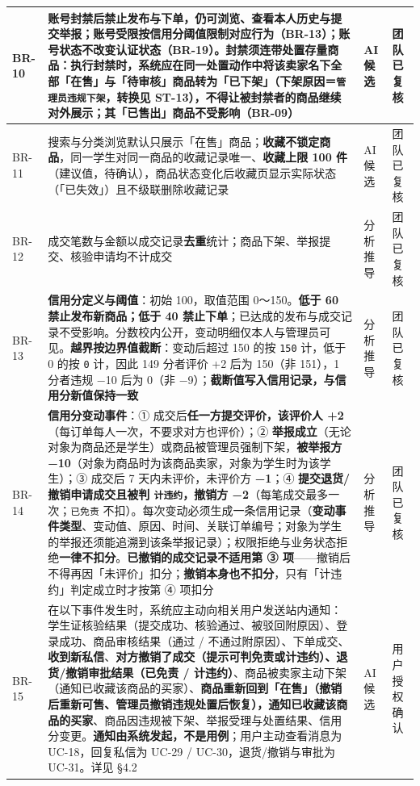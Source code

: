 \documentclass[12pt,a4paper]{ctexart}
\begin{document}
{\begin{longtable}{|p{1.32cm}|p{12.03cm}|p{1.32cm}|p{1.32cm}|}
\hline
BR-10 & 账号封禁后禁止发布与下单，仍可浏览、查看本人历史与提交举报；账号受限按信用分阈值限制对应行为（BR-13）；\textbf{账号状态不改变认证状态}（BR-19）。\textbf{封禁须连带处置存量商品}：执行封禁时，系统应在同一处置动作中将该卖家名下全部「在售」与「待审核」商品转为「已下架」（下架原因＝\texttt{管理员违规下架}，转换见 ST-13），\textbf{不得让被封禁者的商品继续对外展示}；其「已售出」商品不受影响（BR-09） & AI 候选 & 团队已复核 \\
\hline
BR-11 & 搜索与分类浏览默认只展示「在售」商品；\textbf{收藏不锁定商品}，同一学生对同一商品的收藏记录唯一、\textbf{收藏上限 100 件}（建议值，待确认），商品状态变化后收藏页显示实际状态（「已失效」）且不级联删除收藏记录 & AI 候选 & 团队已复核 \\
\hline
BR-12 & 成交笔数与金额以成交记录\textbf{去重}统计；商品下架、举报提交、核验申请均不计成交 & 分析推导 & 团队已复核 \\
\hline
BR-13 & \textbf{信用分定义与阈值}：初始 100，取值范围 0～150。\textbf{低于 60 禁止发布新商品；低于 40 禁止下单}；已达成的发布与成交记录不受影响。分数校内公开，变动明细仅本人与管理员可见。\textbf{越界按边界值截断}：变动后超过 150 的按 \texttt{150} 计，低于 0 的按 \texttt{0} 计，因此 149 分者评价 +2 后为 150（非 151），1 分者违规 −10 后为 0（非 −9）；\textbf{截断值写入信用记录，与信用分新值保持一致} & 分析推导 & 团队已复核 \\
\hline
BR-14 & \textbf{信用分变动事件}：① 成交后\textbf{任一方提交评价，该评价人 +2}（每订单每人一次，不要求对方也评价）；② \textbf{举报成立}（无论对象为商品还是学生）或商品被管理员强制下架，\textbf{被举报方 −10}（对象为商品时为该商品卖家，对象为学生时为该学生）；③ 成交后 7 天内未评价，未评价方 \textbf{−1}；④ \textbf{提交退货/撤销申请成交且被判 \texttt{计违约}，撤销方 −2}（每笔成交最多一次；\texttt{已免责} 不扣）。每次变动必须生成一条信用记录（\textbf{变动事件类型}、变动值、原因、时间、关联订单编号；对象为学生的举报还须能追溯到该条举报记录）；权限拒绝与业务状态拒绝\textbf{一律不扣分}。\textbf{已撤销的成交记录不适用第 ③ 项}——撤销后不得再因「未评价」扣分；\textbf{撤销本身也不扣分}，只有「计违约」判定成立时才按第 ④ 项扣分 & 分析推导 & 团队已复核 \\
\hline
BR-15 & 在以下事件发生时，系统应主动向相关用户发送站内通知：学生证核验结果（提交成功、核验通过、被驳回附原因）、登录成功、商品审核结果（通过 / 不通过附原因）、下单成交、\textbf{收到新私信}、\textbf{对方撤销了成交（提示可判免责或计违约）、退货/撤销审批结果（已免责 / 计违约）}、商品被卖家主动下架（通知已收藏该商品的买家）、\textbf{商品重新回到「在售」（撤销后重新可售、管理员撤销违规处置后恢复），通知已收藏该商品的买家}、商品因违规被下架、举报受理与处置结果、信用分变更。\textbf{通知由系统发起，不是用例}；用户主动查看消息为 UC-18，回复私信为 UC-29 / UC-30，退货/撤销与审批为 UC-31。详见 §4.2 & AI 候选 & 用户授权确认 \\

\end{longtable}}
\end{document}
